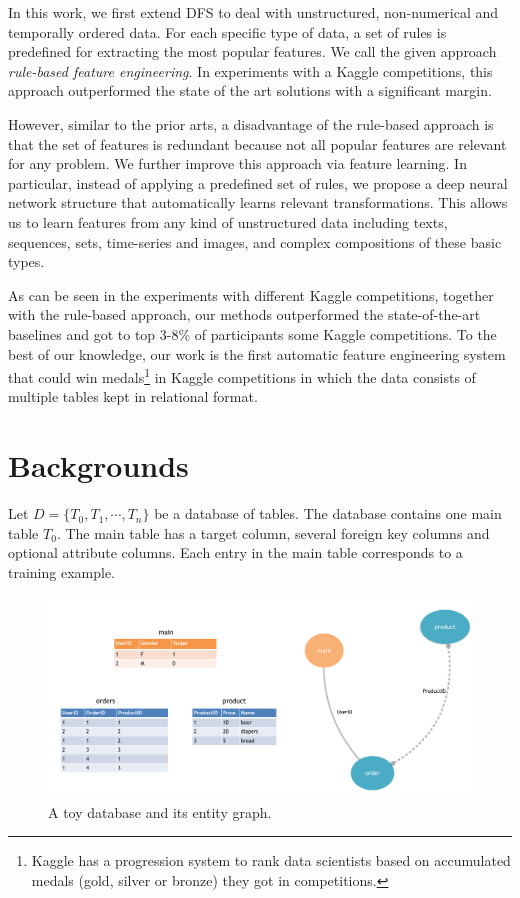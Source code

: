 In this work, we first extend DFS to deal with unstructured, non-numerical and temporally ordered data. For each specific type of data, a set of rules is predefined for extracting the most popular features. We call the given approach \textit{rule-based feature engineering}. In experiments with a Kaggle competitions, this approach outperformed the state of the art solutions with a significant margin.

However, similar to the prior arts, a disadvantage of the rule-based approach is that the set of features is redundant because not all popular features are relevant for any problem. We further improve this approach via  feature learning. In particular, instead of applying a predefined set of rules, we propose a deep neural network structure that automatically learns relevant transformations. This allows us to learn features from any kind of unstructured data including texts, sequences, sets, time-series and images, and complex compositions of these basic types.

 As can be seen in the experiments with different Kaggle competitions, together with the rule-based approach, our methods outperformed the state-of-the-art baselines and got to top 3-8\% of participants some Kaggle competitions. To the best of our knowledge, our work is the first automatic feature engineering system that could win medals\footnote{Kaggle has a progression system to rank data scientists based on accumulated medals (gold, silver or bronze) they got in competitions.} in Kaggle competitions in which the data consists of multiple tables kept in relational format.
\section{Backgrounds}
Let $D = \{T_0,T_1,\cdots,T_n\}$ be a database of tables. The database contains one main table $T_0$. The main table has a target column, several foreign key columns and optional attribute columns. Each entry in the main table corresponds to a training example.


\begin{figure}[tb]
    \centering
    \includegraphics[width=1.0\columnwidth]{./toys.pdf}
    \caption{A toy database and its entity graph.}
    \label{fig:database}
\end{figure}


